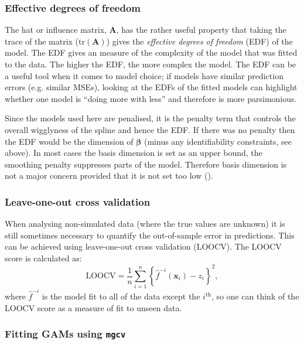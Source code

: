 \subsubsection{Effective degrees of freedom}
\label{GAMEDF}

The hat or influence matrix, $\mathbf{A}$, has the rather useful property that taking the trace of the matrix ($\text{tr}(\mathbf{A})$) gives the \textit{effective degrees of freedom} (EDF) of the model. The EDF gives an measure of the complexity of the model that was fitted to the data. The higher the EDF, the more complex the model. The EDF can be a useful tool when it comes to model choice; if models have similar prediction errors (e.g. similar MSEs), looking at the EDFs of the fitted models can highlight whether one model is ``doing more with less'' and therefore is more parsimonious.

Since the models used here are penalised, it is the penalty term that controls the overall wigglyness of the spline and hence the EDF. If there was no penalty then the EDF would be the dimension of $\bm{\beta}$ (minus any identifiability constraints, see above). In most cases the basis dimension is set as an upper bound, the smoothing penalty suppresses parts of the model. Therefore basis dimension is not a major concern provided that it is not set too low (\cite[p. 161]{simonbook}). 

\subsubsection{Leave-one-out cross validation}
\label{DEFN-LOOCV}

When analysing non-simulated data (where the true values are unknown) it is still sometimes necessary to quantify the out-of-sample error in predictions. This can be achieved using leave-one-out cross validation (LOOCV). The LOOCV score is calculated as:
\begin{equation}
\text{LOOCV} = \frac{1}{n} \sum_{i=1}^n \left \{ \hat{f}^{-i}(\mathbf{x}_i) - z_i \right\}^2,
\end{equation}
where $\hat{f}^{-i}$ is the model fit to all of the data except the $i^\text{th}$, so one can think of the LOOCV score as a measure of fit to unseen data.

\subsubsection{Fitting GAMs using \texttt{mgcv}}
\label{intro-mgcv}


